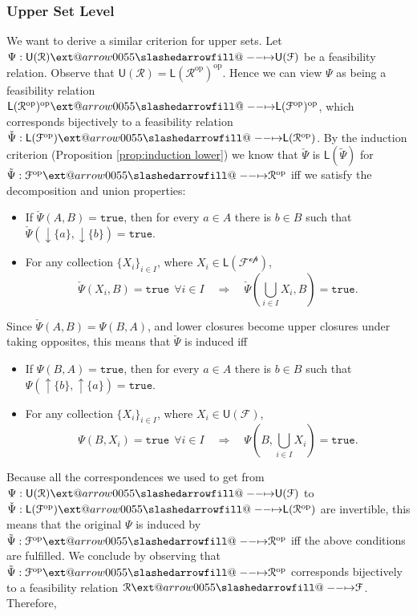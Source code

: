 \documentclass[12pt]{article}
\makeatletter
\theoremstyle{definition}
\theoremstyle{plain}
\theoremstyle{plain}
\theoremstyle{plain}
\theoremstyle{plain}
\theoremstyle{remark}
\theoremstyle{remark}
\newcommand{\mc}[1]{\mathcal{#1}}
\newcommand{\low}{\mathsf{L}}
\newcommand{\upper}{\mathsf{U}}
\newcommand{\true}{\mathtt{true}}
\newcommand{\upc}[1]{{\uparrow #1}}
\newcommand{\lwc}[1]{{\downarrow #1}}
\def\slashedarrowfill@#1#2#3#4#5{%
	$\m@th\thickmuskip0mu\medmuskip\thickmuskip\thinmuskip\thickmuskip
	\relax#5#1\mkern-7mu%
	\cleaders\hbox{$#5\mkern-2mu#2\mkern-2mu$}\hfill
	\mathclap{#3}\mathclap{#2}%
	\cleaders\hbox{$#5\mkern-2mu#2\mkern-2mu$}\hfill
	\mkern-7mu#4$%
}
\def\rightslashedarrowfill@{%
	\slashedarrowfill@\relbar\relbar\mapstochar\rightarrow}
\newcommand\xslashedrightarrow[2][]{%
	\ext@arrow 0055{\rightslashedarrowfill@}{#1}{#2}}
\makeatother
\begin{document}
\subsubsection{Upper Set Level}
We want to derive a similar criterion for upper sets. Let  $\Psi: \upper(\mc{R}) \xslashedrightarrow{} \upper(\mc{F})$ be a feasibility relation. Observe that $\upper(\mc{R}) = \low(\mc{R}^\text{op})^\text{op}$. Hence we can view $\Psi$ as being a feasibility relation $\low(\mc{R}^\text{op})^\text{op} \xslashedrightarrow{} \low(\mc{F}^\text{op})^\text{op}$, which corresponds bijectively to a feasibility relation $\check\Psi: \low(\mc{F}^\text{op}) \xslashedrightarrow{} \low(\mc{R}^\text{op})$. By the induction criterion (Proposition \ref{prop:induction lower}) we know that $\check\Psi$ is $\low(\tilde\Psi)$ for $\tilde\Psi: \mc{F}^\text{op} \xslashedrightarrow{} \mc{R}^\text{op}$ iff we satisfy the decomposition and union properties:
\begin{itemize}
	\item If $\check\Psi(A,B)=\true$, then for every $a \in A$ there is $b \in B$ such that $\check\Psi(\lwc{\{a\}},\lwc{\{b\}})=\true$.
	\item For any collection $\{X_i\}_{i \in I}$, where $X_i \in \low(\mc{F^\text{op}})$,
	$$\check\Psi(X_i,B) = \true \:\: \forall i \in I \quad \Rightarrow \quad \check\Psi(\bigcup_{i \in I} X_i,B) = \true.$$
\end{itemize}

Since $\check\Psi(A,B) = \Psi(B,A)$, and lower closures become upper closures under taking opposites, this means that $\check\Psi$ is induced iff
\begin{itemize}
	\item If $\Psi(B,A)=\true$, then for every $a \in A$ there is $b \in B$ such that $\Psi(\upc{\{b\}},\upc{\{a\}})=\true$.
	\item For any collection $\{X_i\}_{i \in I}$, where $X_i \in \upper(\mc{F})$,
	$$\Psi(B,X_i) = \true \:\: \forall i \in I \quad \Rightarrow \quad \Psi(B,\bigcup_{i \in I} X_i) = \true.$$
\end{itemize}
Because all the correspondences we used to get from $\Psi: \upper(\mc{R}) \xslashedrightarrow{} \upper(\mc{F})$ to $\check\Psi: \low(\mc{F}^\text{op}) \xslashedrightarrow{} \low(\mc{R}^\text{op})$ are invertible, this means that the original $\Psi$ is induced by $\tilde\Psi: \mc{F}^\text{op} \xslashedrightarrow{} \mc{R}^\text{op}$ iff the above conditions are fulfilled. We conclude by observing that $\tilde\Psi: \mc{F}^\text{op} \xslashedrightarrow{} \mc{R}^\text{op}$ corresponds bijectively to a feasibility relation $\mc{R} \xslashedrightarrow{} \mc{F}$. Therefore,
\end{document}
